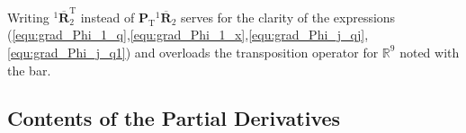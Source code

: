 \documentclass[robotics,article,accept,moreauthors,pdftex]{Definitions/mdpi}
\newcommand{\bm}[1]{\boldsymbol{#1}}
\DeclareMathOperator{\arctantwo}{arctan2}
\newcommand{\rotmato}[2]{{{ }^{#1}\boldsymbol{\overline{R}}}_{#2}}
\newcommand{\transp}[0]{{\mathrm{T}}}
\begin{document}
Writing $\rotmato{1}{2}^\transp$ instead of $\bm{P}_\transp \rotmato{1}{2}$ serves for the clarity of the expressions (\ref{equ:grad_Phi_1_q},\ref{equ:grad_Phi_1_x},\ref{equ:grad_Phi_j_qj},\ref{equ:grad_Phi_j_q1}) and overloads the transposition operator for ${\mathbb{R}}^{9}$ noted with the bar.

\subsection{Contents of the Partial Derivatives}
\label{sec:appendix_content_derivatives}
\end{document}
